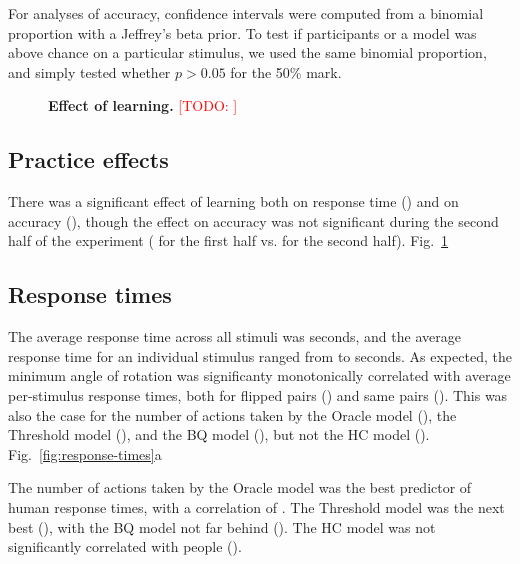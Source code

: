 \documentclass[10pt,letterpaper]{article}
\newcommand{\TODO}[1]{\textcolor{red}{[TODO: #1]}}
\newcommand{\Oc}[0]{Oracle}
\newcommand{\Th}[0]{Threshold}
\newcommand{\Hc}[0]{HC}
\newcommand{\Bq}[0]{BQ}
\begin{document}
For analyses of accuracy, confidence intervals were computed from a
binomial proportion with a Jeffrey's beta prior.  To test if
participants or a model was above chance on a particular stimulus, we
used the same binomial proportion, and simply tested whether $p>0.05$
for the 50\% mark.

\begin{figure}[t]
  \centering
  \caption{\textbf{Effect of learning.} \TODO{}}
  \label{fig:learning}
\end{figure}

\subsection{Practice effects} 

There was a significant effect of learning both on response time
(\ExpTrialTimeCorr{}) and on accuracy (\ExpTrialAccuracyCorr{}),
though the effect on accuracy was not significant during the second
half of the experiment (\ExpaTrialAccuracyCorr{} for the first half
vs. \ExpbTrialAccuracyCorr{} for the second
half). Fig.~\ref{fig:learning}


\subsection{Response times}

The average response time across all stimuli was \ExpTime{} seconds,
and the average response time for an individual stimulus ranged from
\ExpTimeMin{} to \ExpTimeMax{} seconds.  As expected, the minimum
angle of rotation was significanty monotonically correlated with
average per-stimulus response times, both for flipped pairs
(\ExpThetaTimeCorrFlipped{}) and same pairs
(\ExpThetaTimeCorrSame{}). This was also the case for the number of
actions taken by the \Oc{} model (\OcThetaTimeCorr{}), the \Th{} model
(\ThThetaTimeCorr{}), and the \Bq{} model (\BqThetaTimeCorr{}), but
not the \Hc{} model
(\HcThetaTimeCorr{}). Fig.~\ref{fig:response-times}a

The number of actions taken by the \Oc{} model was the best predictor
of human response times, with a correlation of \ExpOcTimeCorr{}. The
\Th{} model was the next best (\ExpThTimeCorr{}), with the \Bq{} model
not far behind (\ExpBqTimeCorr{}). The \Hc{} model was not
significantly correlated with people (\ExpHcTimeCorr{}).
\end{document}

